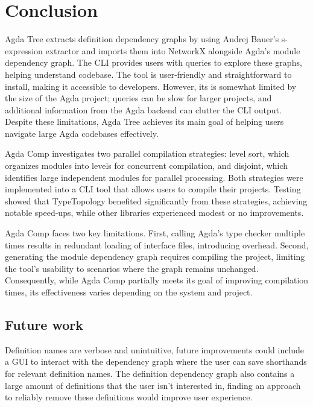 
\chapter{Conclusion}

Agda Tree extracts definition dependency graphs by using Andrej
Bauer's s-expression extractor \cite{andrej} and imports them into NetworkX
alongside Agda's module dependency graph. The CLI provides users with
queries to explore these graphs, helping understand codebase.
The tool is user-friendly and straightforward to install, making it accessible
to developers. However, its is somewhat limited by the size
of the Agda project; queries can be slow for larger projects, and additional
information from the Agda backend can clutter the CLI output. Despite these
limitations, Agda Tree achieves its main goal of helping users navigate
large Agda codebases effectively.

Agda Comp investigates two parallel compilation strategies: level sort, which
organizes modules into levels for concurrent compilation, and disjoint, which
identifies large independent modules for parallel processing. Both strategies
were implemented into a CLI tool that allows users to compile their projects.
Testing showed that TypeTopology benefited significantly from these
strategies, achieving notable speed-ups, while other libraries experienced
modest or no improvements.

Agda Comp faces two key limitations. First, calling Agda's type checker
multiple times results in redundant loading of interface files, introducing
overhead. Second, generating the module dependency graph requires compiling the
project, limiting the tool's usability to scenarios where the graph remains
unchanged. Consequently, while Agda Comp partially meets its goal of improving
compilation times, its effectiveness varies depending on the system and
project.

\section{Future work}

Definition names are verbose and unintuitive, future improvements could include
a GUI to interact with the dependency graph where the user can save shorthands
for relevant definition names. The definition dependency graph also contains a
large amount of definitions that the user isn't interested in, finding an
approach to reliably remove these definitions would improve user experience.

